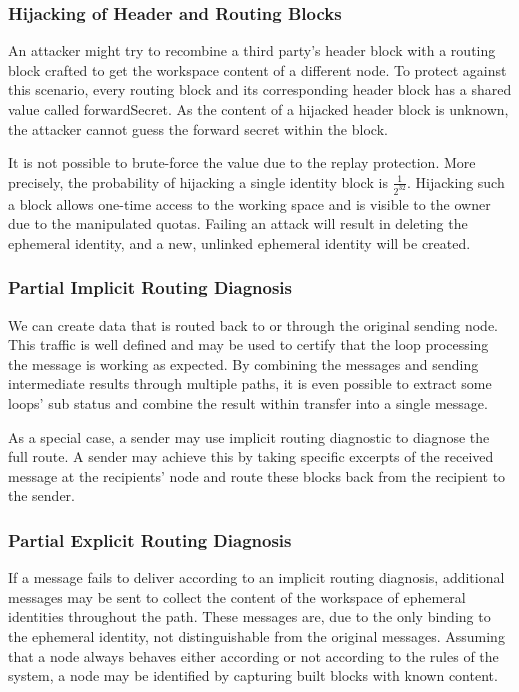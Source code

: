 \subsubsection{Hijacking of Header and Routing Blocks}
An attacker might try to recombine a third party's header block with a routing block crafted to get the workspace content of a different node. To protect against this scenario, every routing block and its corresponding header block has a shared value called forwardSecret. As the content of a hijacked header block is unknown, the attacker cannot guess the forward secret within the block.

It is not possible to brute-force the value due to the replay protection. More precisely, the probability of hijacking a single identity block is $\frac{1}{2^{32}}$. Hijacking such a block allows one-time access to the working space and is visible to the owner due to the manipulated quotas. Failing an attack will result in deleting the ephemeral identity, and a new, unlinked ephemeral identity will be created. 

\subsubsection{Partial Implicit Routing Diagnosis}
We can create data that is routed back to or through the original sending node. This traffic is well defined and may be used to certify that the loop processing the message is working as expected. By combining the messages and sending intermediate results through multiple paths, it is even possible to extract some loops' sub status and combine the result within transfer into a single message.

As a special case, a sender may use implicit routing diagnostic to diagnose the full route. A sender may achieve this by taking specific excerpts of the received message at the recipients' node and route these blocks back from the recipient to the sender. 

\subsubsection{Partial Explicit Routing Diagnosis}
If a message fails to deliver according to an implicit routing diagnosis, additional messages may be sent to collect the content of the workspace of ephemeral identities throughout the path. These messages are, due to the only binding to the ephemeral identity, not distinguishable from the original messages. Assuming that a node always behaves either according or not according to the rules of the system, a node may be identified by capturing built blocks with known content.


